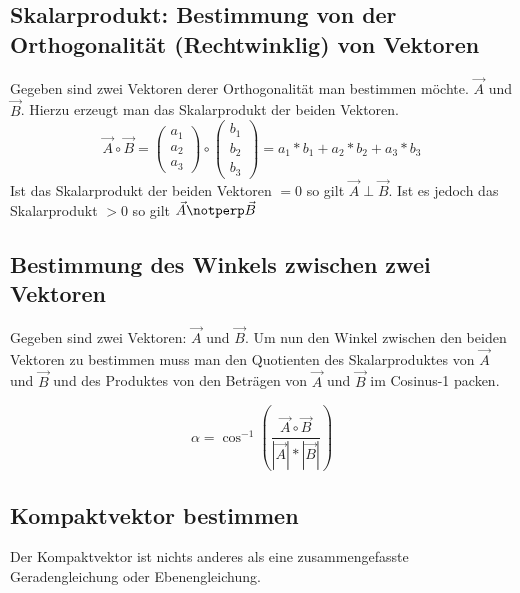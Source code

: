 \documentclass{article}
\begin{document}
\subsection{Skalarprodukt: Bestimmung von der Orthogonalität (Rechtwinklig) von Vektoren}
Gegeben sind zwei Vektoren derer Orthogonalität man bestimmen möchte. $\vec{A}$ und $\vec{B}$. Hierzu erzeugt man das Skalarprodukt der beiden Vektoren.
\begin{equation}
\vec{A} \circ \vec{B} = \begin{pmatrix} a_1 \\ a_2 \\ a_3\end{pmatrix} \circ \begin{pmatrix} b_1 \\ b_2 \\ b_3\end{pmatrix} = a_1*b_1 + a_2*b_2 + a_3*b_3
\end{equation}
Ist das Skalarprodukt der beiden Vektoren $= 0$ so gilt $\vec{A} \perp \vec{B}$. Ist es jedoch das Skalarprodukt $> 0$ so gilt $\vec{A} \notperp \vec{B}$

\subsection{Bestimmung des Winkels zwischen zwei Vektoren}
Gegeben sind zwei Vektoren: $\vec{A}$ und $\vec{B}$. Um nun den Winkel zwischen den beiden Vektoren zu bestimmen muss man den Quotienten des Skalarproduktes von $\vec{A}$ und $\vec{B}$ und des Produktes von den Beträgen von $\vec{A}$ und $\vec{B}$ im Cosinus-1 packen.

\begin{equation}
\alpha = \cos^{-1} ( \frac{\vec{A} \circ \vec{B}}{|\vec{A}| * |\vec{B}|} )
\end{equation}

\subsection{Kompaktvektor bestimmen}
Der Kompaktvektor ist nichts anderes als eine zusammengefasste Geradengleichung oder Ebenengleichung.
\end{document}
